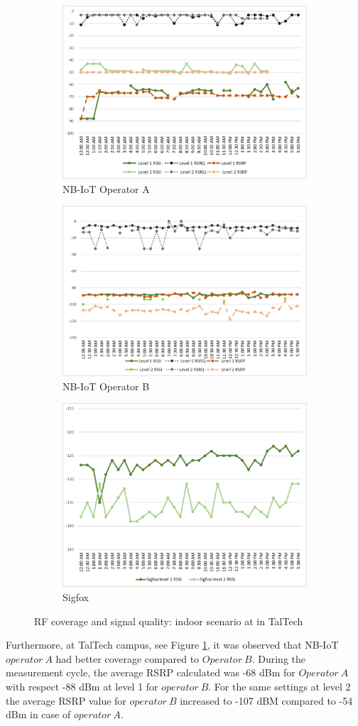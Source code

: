 \documentclass[12pt]{article}
\begin{document}
 \begin{figure}[h!]
\begin{subfigure}[t]{\linewidth}
  \centering
  \includegraphics[width=.5\linewidth]{Images/tallinn/ATallinnIndoor.pdf}  
  \caption{NB-IoT Operator A}
\end{subfigure}
\begin{subfigure}[t]{\linewidth}
  \centering
  \includegraphics[width=.5\linewidth]{Images/tallinn/BTallinnIndoor.pdf}  
  \caption{NB-IoT Operator B}
  
\end{subfigure}
\begin{subfigure}[t]{\linewidth}
  \centering
  \includegraphics[width=.5\linewidth]{Images/tallinn/STallinnIndoor.pdf}  
\caption{Sigfox}
 \end{subfigure}
\caption{RF coverage and signal quality: indoor scenario at in TalTech}
 \label{RFIndoor Tallinn}
\end{figure}
Furthermore, at TalTech campus, see Figure \ref{RFIndoor Tallinn}, it was observed that NB-IoT $operator\ A$ had better coverage compared to $Operator\ B$. During the measurement cycle, the average RSRP calculated  was -68 dBm for $Operator\ A$ with respect -88 dBm at level 1 for $operator\ B$. For the same settings at level 2 the average RSRP value for $operator\ B$ increased to -107 dBM compared to -54 dBm in case of $operator\ A$. 
\end{document}
